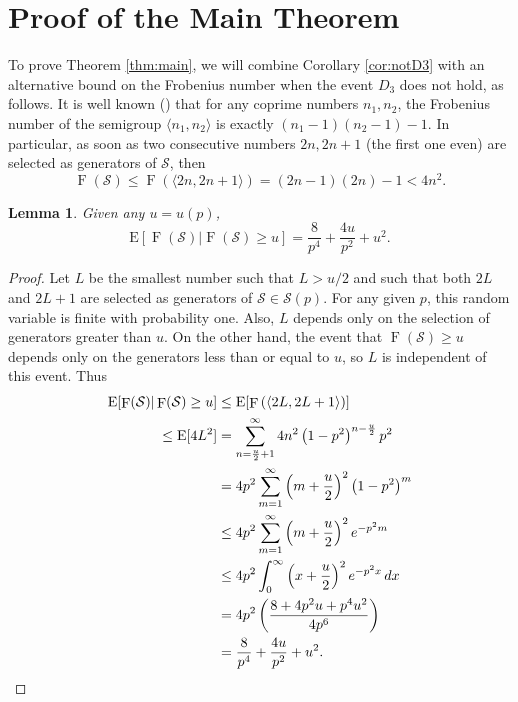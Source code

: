 \documentclass[11pt]{amsart}
\newtheorem{lemma}[theorem]{Lemma}
\theoremstyle{definition}
\theoremstyle{remark}
\def\EE{\ensuremath{\mathrm{E}}}
\def\nsg{\ensuremath{\mathcal{S}}}
\DeclareMathOperator\F{F}
\begin{document}
\section{Proof of the Main Theorem}
To prove Theorem \ref{thm:main}, we will combine Corollary \ref{cor:notD3} with an alternative bound on the Frobenius number when the event $D_3$ does not hold, as follows. It is well known (\cite[Proposition 2.13]{rosales2009numerical}) that for any coprime numbers $n_1, n_2$, the Frobenius number of the semigroup $\langle n_1, n_2 \rangle$ is exactly $(n_1-1)(n_2-1)-1$. In particular, as soon as two consecutive numbers $2n, 2n+1$ (the first one even) are selected as generators of $\nsg$, then
\begin{equation} \F(\nsg) \leq \F\left( \langle 2n, 2n+1 \rangle \right) = (2n-1)(2n) - 1 < 4n^2. \end{equation}

\begin{lemma} \label{lem:unlikelycase}
  Given any $u = u(p)$,
  \[ \EE[\F(\nsg) | \F(\nsg) \geq u] = \frac{8}{p^4} + \frac{4u}{p^2} + u^2 .\]
\end{lemma}
\begin{proof}
  Let $L$ be the smallest number such that $L > u/2$ and such that both $2L$ and $2L+1$ are selected as generators of $\nsg \in \nsg(p)$. For any given $p$, this random variable is finite with probability one. Also, $L$ depends only on the selection of generators greater than $u$. On the other hand, the event that $\F(\nsg) \geq u$ depends only on the generators less than or equal to $u$, so $L$ is independent of this event. Thus
  \begin{align*}
    \EE[\F(\nsg) | \F(\nsg) \geq u] & \leq \EE[\F\left( \langle 2L, 2L+1 \rangle \right)] \\
   \leq \EE[4L^2] & = \sum_{n=\frac{u}{2}+1}^{\infty}4n^2\left(1-p^2\right)^{n-\frac{u}{2}}p^2 \\
    & = 4p^2 \sum_{m=1}^{\infty}\left( m + \frac{u}{2}\right)^2\left(1-p^2\right)^m \\
    & \leq 4p^2 \sum_{m=1}^{\infty}\left( m + \frac{u}{2}\right)^2 e^{-p^2m} \\
    & \leq 4p^2 \int_0^\infty \left( x + \frac{u}{2}\right)^2 e^{-p^2x} \, dx \\
    & = 4p^2 \left( \frac{8+4p^2u+p^4u^2}{4p^6} \right) \\
    & = \frac{8}{p^4} + \frac{4u}{p^2} + u^2. \qedhere
  \end{align*}  
\end{proof}
\end{document}
